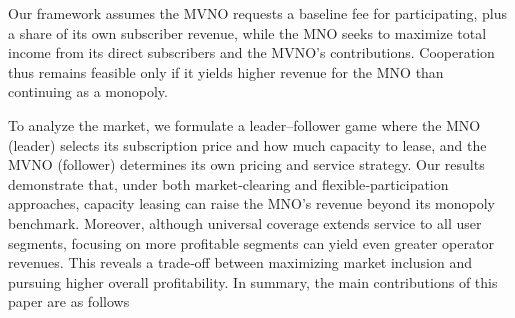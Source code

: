 \documentclass[12pt, draftclsnofoot, onecolumn]{IEEEtran}
\begin{document}
	
	Our framework assumes the MVNO requests a baseline fee for participating, plus a share of its own subscriber revenue, while the MNO seeks to maximize total income from its direct subscribers and the MVNO’s contributions. Cooperation thus remains feasible only if it yields higher revenue for the MNO than continuing as a monopoly.
	
	To analyze the market, we formulate a leader–follower game where the MNO (leader) selects its subscription price and how much capacity to lease, and the MVNO (follower) determines its own pricing and service strategy. Our results demonstrate that, under both market‐clearing and flexible‐participation approaches, capacity leasing can raise the MNO’s revenue beyond its monopoly benchmark. Moreover, although universal coverage extends service to all user segments, focusing on more profitable segments can yield even greater operator revenues. This reveals a trade‐off between maximizing market inclusion and pursuing higher overall profitability.	In summary, the main contributions of this paper are as follows
\end{document}
